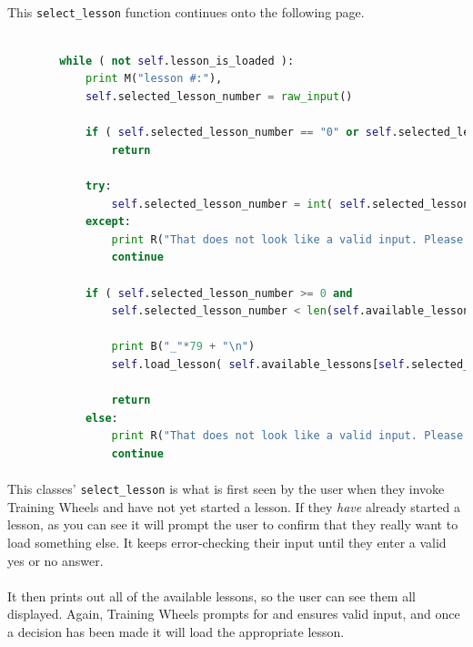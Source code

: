 \documentclass[11pt]{article}
\begin{document}
	\paragraph{}

	\paragraph{} This \texttt{select\_lesson} function continues onto the following page.

	\newpage

	\begin{lstlisting}[language=Python]

		while ( not self.lesson_is_loaded ):
			print M("lesson #:"),
			self.selected_lesson_number = raw_input()

			if ( self.selected_lesson_number == "0" or self.selected_lesson_number == "quit" ):
				return

			try:
				self.selected_lesson_number = int( self.selected_lesson_number ) - 1
			except:
				print R("That does not look like a valid input. Please try again.")
				continue

			if ( self.selected_lesson_number >= 0 and 
				self.selected_lesson_number < len(self.available_lessons) ):

				print B("_"*79 + "\n")
				self.load_lesson( self.available_lessons[self.selected_lesson_number] )
				
				return
			else:
				print R("That does not look like a valid input. Please try again.")
				continue

	\end{lstlisting}	

	\paragraph{} This classes' \texttt{select\_lesson} is what is first seen by the user when they invoke Training Wheels and have not yet started a lesson. If they \textit{have} already started a lesson, as you can see it will prompt the user to confirm that they really want to load something else. It keeps error-checking their input until they enter a valid yes or no answer.

	\paragraph{} It then prints out all of the available lessons, so the user can see them all displayed. Again, Training Wheels prompts for and ensures valid input, and once a decision has been made it will load the appropriate lesson.
\end{document}
